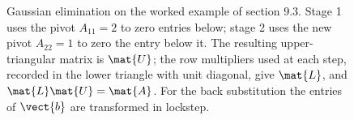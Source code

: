 \begin{figure}[ht]
\begin{tikzpicture}[x=1cm, y=1cm, font=\small]
\end{tikzpicture}
\caption[Two-stage Gaussian elimination on a $3 \times 3$ system]{Gaussian
elimination on the worked example of section 9.3. Stage 1 uses the
pivot $A_{11} = 2$ to zero entries below; stage 2 uses the new pivot
$A_{22} = 1$ to zero the entry below it. The resulting upper-triangular
matrix is $\mat{U}$; the row multipliers used at each step, recorded in
the lower triangle with unit diagonal, give $\mat{L}$, and
$\mat{L}\mat{U} = \mat{A}$. For the back substitution the entries of
$\vect{b}$ are transformed in lockstep.}
\label{fig:vol02:ch09:gaussian-elimination}
\end{figure}
